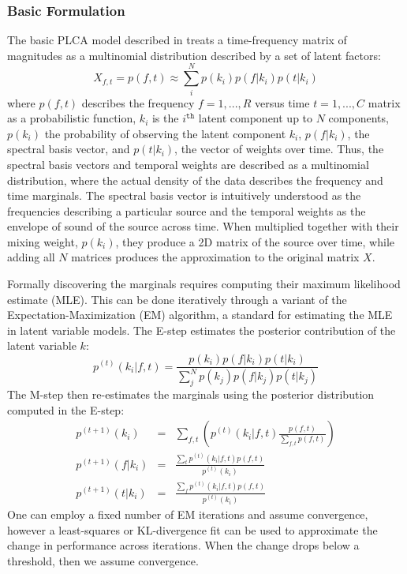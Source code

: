 \subsubsection{Basic Formulation}
The basic PLCA model described in \cite{SmaragdisRajShashanka} treats a time-frequency matrix of magnitudes as a multinomial distribution described by a set of latent factors:
\begin{equation}\label{eq:plca}
X_{f,t} = p(f,t) \approx \sum\limits_{i}^{N}p(k_i)p(f|k_i)p(t|k_i)  
\end{equation}
where $p(f,t)$ describes the frequency $f = {1,...,R}$ versus time $t = {1,...,C}$ matrix as a probabilistic function, $k_i$ is the $i^{\mathtt{th}}$ latent component up to $N$ components, $p(k_i)$ the probability of observing the latent component $k_i$, $p(f|k_i)$, the spectral basis vector, and $p(t|k_i)$, the vector of weights over time.  Thus, the spectral basis vectors and temporal weights are described as a multinomial distribution, where the actual density of the data describes the frequency and time marginals.  The spectral basis vector is intuitively understood as the frequencies describing a particular source and the temporal weights as the envelope of sound of the source across time.  When multiplied together with their mixing weight, $p(k_i)$, they produce a 2D matrix of the source over time, while adding all $N$ matrices produces the approximation to the original matrix $X$.  

Formally discovering the marginals requires computing their maximum likelihood estimate (MLE).  This can be done iteratively through a variant of the Expectation-Maximization (EM) algorithm, a standard for estimating the MLE in latent variable models.  The E-step estimates the posterior contribution of the latent variable $k$:
\begin{equation}
p^{(t)}(k_i|f,t) = \frac{p(k_i)p(f|k_i)p(t|k_i)}{\sum_{j}^{N}p(k_j)p(f|k_j)p(t|k_j)}  
\end{equation}
The M-step then re-estimates the marginals using the posterior distribution computed in the E-step:
\begin{eqnarray}
p^{(t+1)}(k_i) &=& \sum_{f,t}\left(p^{(t)}(k_i|f,t)\frac{p(f,t)}{\sum_{f,t}p(f,t)}\right)  \\
p^{(t+1)}(f|k_i) &=& \frac{\sum_{t}p^{(t)}(k_i|f,t)p(f,t)}{p^{(t)}(k_i)}  \\
p^{(t+1)}(t|k_i) &=& \frac{\sum_{f}p^{(t)}(k_i|f,t)p(f,t)}{p^{(t)}(k_i)}  
\end{eqnarray}
One can employ a fixed number of EM iterations and assume convergence, however a least-squares or KL-divergence fit can be used to approximate the change in performance across iterations.  When the change drops below a threshold, then we assume convergence.  

